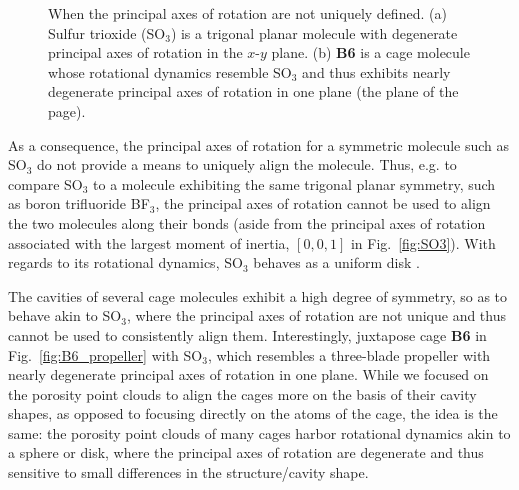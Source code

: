 \documentclass[journal=jacsat,manuscript=article]{achemso}
\begin{document}
\begin{figure}
\centering
	\caption{When the principal axes of rotation are not uniquely defined. (a) Sulfur trioxide (SO$_3$) is a trigonal planar molecule with degenerate principal axes of rotation in the $x$-$y$ plane. (b) \textbf{B6} is a cage molecule whose rotational dynamics resemble SO$_3$ and thus exhibits nearly degenerate principal axes of rotation in one plane (the plane of the page).
	} \label{fig:irrationallyaligned}
\end{figure}

As a consequence, the principal axes of rotation for a symmetric molecule such as SO$_3$ do not provide a means to uniquely align the molecule. Thus, e.g. to compare SO$_3$ to a molecule exhibiting the same trigonal planar symmetry, such as boron trifluoride BF$_3$, the principal axes of rotation cannot be used to align the two molecules along their bonds (aside from the principal axes of rotation associated with the largest moment of inertia, $[0, 0, 1]$ in Fig.~\ref{fig:SO3}). With regards to its rotational dynamics, SO$_3$ behaves as a uniform disk \cite{peraire2008lecture}.

The cavities of several cage molecules exhibit a high degree of symmetry, so as to behave akin to SO$_3$, where the principal axes of rotation are not unique and thus cannot be used to consistently align them. Interestingly, juxtapose cage \textbf{B6} in Fig.~\ref{fig:B6_propeller} with SO$_3$, which resembles a three-blade propeller \cite{peraire2008lecture} with nearly degenerate principal axes of rotation in one plane. While we focused on the porosity point clouds to align the cages more on the basis of their cavity shapes, as opposed to focusing directly on the atoms of the cage, the idea is the same: the porosity point clouds of many cages harbor rotational dynamics akin to a sphere or disk, where the principal axes of rotation are degenerate and thus sensitive to small differences in the structure/cavity shape. 
\end{document}
